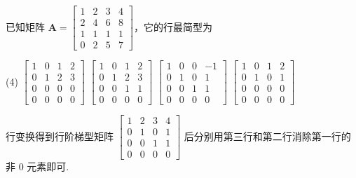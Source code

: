 \begin{problem}
  已知矩阵 $\mathbf A = 
  \begin{bmatrix} 
    1 & 2 & 3 & 4 \\ 
    2 & 4 & 6 & 8 \\ 
    1 & 1 & 1 & 1 \\ 
    0 & 2 & 5 & 7 
  \end{bmatrix}
  $，它的行最简型为
  \begin{tasks}(4)
    \task
    $\begin{bmatrix}
      1 & 0 & 1 & 2 \\ 
      0 & 1 & 2 & 3 \\ 
      0 & 0 & 0 & 0 \\ 
      0 & 0 & 0 & 0 
    \end{bmatrix}$
    \task
    $\begin{bmatrix} 
      1 & 0 & 1 & 2 \\ 
      0 & 1 & 2 & 3 \\ 
      0 & 0 & 1 & 1 \\ 
      0 & 0 & 0 & 0 
    \end{bmatrix}$
    \task[\true]
    $\begin{bmatrix} 
      1 & 0 & 0 & -1 \\ 
      0 & 1 & 0 & 1 \\ 
      0 & 0 & 1 & 1 \\ 
      0 & 0 & 0 & 0 
    \end{bmatrix}$
    \task
    $\begin{bmatrix} 
      1 & 0 & 1 & 2 \\ 
      0 & 1 & 0 & 1 \\ 
      0 & 0 & 0 & 0 \\ 
      0 & 0 & 0 & 0 
    \end{bmatrix}$
  \end{tasks}
\end{problem}
\scratch
\begin{solution}
  行变换得到行阶梯型矩阵
  $\begin{bmatrix}
    1 & 2 & 3 & 4 \\
    0 & 1 & 0 & 1 \\
    0 & 0 & 1 & 1 \\
    0 & 0 & 0 & 0
  \end{bmatrix}$ 后分别用第三行和第二行消除第一行的非 $0$ 元素即可.
\end{solution}

